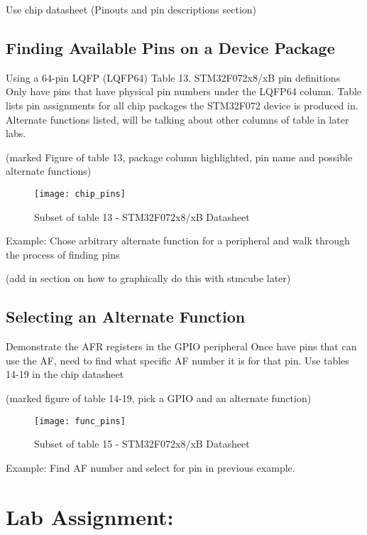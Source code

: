 \documentclass[11pt,fleqn]{book} %
\begin{document}
    Use chip datasheet (Pinouts and pin descriptions section)
    
    \subsection{Finding Available Pins on a Device Package}
    Using a 64-pin LQFP (LQFP64)
    Table 13. STM32F072x8/xB pin definitions
    Only have pins that have physical pin numbers under the LQFP64 column. Table lists pin assignments for all chip packages the STM32F072 device is produced in.
    Alternate functions listed, will be talking about other columns of table in later labs.
    
    (marked Figure of table 13, package column highlighted, pin name and possible alternate functions)
    \begin{figure}[]
        \centering\texttt{[image: chip\_pins]}
        \caption{Subset of table 13 - STM32F072x8/xB Datasheet}
        \label{chip_pins}
    \end{figure}

    \begin{example}
            Example: Chose arbitrary alternate function for a peripheral and walk through the process of finding pins
    \end{example}
    (add in section on how to graphically do this with stmcube later)
    
    \subsection{Selecting an Alternate Function}
    Demonstrate the AFR registers in the GPIO peripheral
    Once have pins that can use the AF, need to find what specific AF number it is for that pin.
    Use tables 14-19 in the chip datasheet
    
    (marked figure of table 14-19, pick a GPIO and an alternate function) 
    \begin{figure}[]
        \centering\texttt{[image: func\_pins]}
        \caption{Subset of table 15 - STM32F072x8/xB Datasheet}
        \label{func_pins}
    \end{figure}
   	
    \begin{example} 
         Example: Find AF number and select for pin in previous example.
    \end{example}
    
\section{Lab Assignment:}
\end{document}
